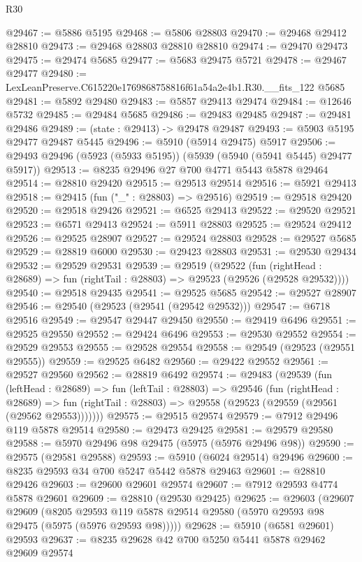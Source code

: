 \begin{lexlean}{R30}
\begin{coremodule}
@29467 := @5886 @5195
@29468 := @5806 @28803
@29470 := @29468 @29412 @28810
@29473 := @29468 @28803 @28810 @28810
@29474 := @29470 @29473
@29475 := @29474 @5685
@29477 := @5683 @29475 @5721
@29478 := @29467 @29477
@29480 := LexLeanPreserve.C615220e1769868758816f61a54a2e4b1.R30.__fits_122 @5685
@29481 := @5892 @29480
@29483 := @5857 @29413 @29474
@29484 := @12646 @5732
@29485 := @29484 @5685
@29486 := @29483 @29485
@29487 := @29481 @29486
@29489 := (state : @29413) -> @29478 @29487
@29493 := @5903 @5195 @29477 @29487 @5445
@29496 := @5910 (@5914 @29475) @5917
@29506 := @29493 @29496 (@5923 (@5933 @5195)) (@5939 (@5940 (@5941 @5445) @29477 @5917))
@29513 := @8235 @29496 @27 @700 @4771 @5443 @5878 @29464
@29514 := @28810 @29420
@29515 := @29513 @29514
@29516 := @5921 @29413
@29518 := @29415 (fun ("_" : @28803) => @29516)
@29519 := @29518 @29420
@29520 := @29518 @29426
@29521 := @6525 @29413
@29522 := @29520 @29521
@29523 := @6571 @29413
@29524 := @5911 @28803
@29525 := @29524 @29412
@29526 := @29525 @28907
@29527 := @29524 @28803
@29528 := @29527 @5685
@29529 := @28819 @6000
@29530 := @29423 @28803
@29531 := @29530 @29434
@29532 := @29529 @29531
@29539 := @29519
    (@29522
      (fun (rightHead : @28689) => fun (rightTail : @28803) => @29523 (@29526 (@29528 @29532))))
@29540 := @29518 @29435
@29541 := @29525 @5685
@29542 := @29527 @28907
@29546 := @29540 (@29523 (@29541 (@29542 @29532)))
@29547 := @6718 @29516
@29549 := @29547 @29447 @29450
@29550 := @29419 @6496
@29551 := @29525 @29550
@29552 := @29424 @6496
@29553 := @29530 @29552
@29554 := @29529 @29553
@29555 := @29528 @29554
@29558 := @29549 (@29523 (@29551 @29555))
@29559 := @29525 @6482
@29560 := @29422 @29552
@29561 := @29527 @29560
@29562 := @28819 @6492
@29574 := @29483
    (@29539
      (fun (leftHead : @28689) =>
      fun (leftTail : @28803) =>
      @29546
        (fun (rightHead : @28689) =>
        fun (rightTail : @28803) => @29558 (@29523 (@29559 (@29561 (@29562 @29553)))))))
@29575 := @29515 @29574
@29579 := @7912 @29496 @119 @5878 @29514
@29580 := @29473 @29425
@29581 := @29579 @29580
@29588 := @5970 @29496 @98 @29475 (@5975 (@5976 @29496 @98))
@29590 := @29575 (@29581 @29588)
@29593 := @5910 (@6024 @29514) @29496
@29600 := @8235 @29593 @34 @700 @5247 @5442 @5878 @29463
@29601 := @28810 @29426
@29603 := @29600 @29601 @29574
@29607 := @7912 @29593 @4774 @5878 @29601
@29609 := @28810 (@29530 @29425)
@29625 := @29603
    (@29607
      @29609
      (@8205 @29593 @119 @5878 @29514 @29580 (@5970 @29593 @98 @29475 (@5975 (@5976 @29593 @98)))))
@29628 := @5910 (@6581 @29601) @29593
@29637 := @8235 @29628 @42 @700 @5250 @5441 @5878 @29462 @29609 @29574

\end{coremodule}
\end{lexlean}
